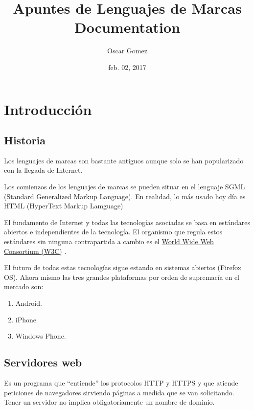 \documentclass[letterpaper,10pt,spanish]{sphinxmanual}
\title{Apuntes de Lenguajes de Marcas Documentation}
\date{feb. 02, 2017}
\author{Oscar Gomez}
\begin{document}
\maketitle
\tableofcontents
{}\label{index::doc}



\chapter{Introducción}
\label{tema1::doc}\label{tema1:apuntes-de-lenguajes-de-marcas}\label{tema1:introduccion}

\section{Historia}
\label{tema1:historia}
Los lenguajes de marcas son bastante antiguos aunque solo se han popularizado con la llegada de Internet.

Los comienzos de los lenguajes de marcas se pueden situar en el lenguaje SGML (Standard Generalized Markup Language). En realidad, lo más usado hoy día es HTML (HyperText Markup Lamguage)

El fundamento de Internet y todas las tecnologías asociadas se basa en estándares abiertos e
independientes de la tecnología. El organismo que regula estos estándares sin ninguna contrapartida a cambio es el \href{http://www.w3c.org}{World Wide Web Consortium (W3C)} .

El futuro de todas estas tecnologías sigue estando en sistemas abiertos (Firefox OS). Ahora mismo las tres grandes plataformas por orden de supremacía en el mercado son:
\begin{enumerate}
\item {} 
Android.

\item {} 
iPhone

\item {} 
Windows Phone.

\end{enumerate}


\section{Servidores web}
\label{tema1:servidores-web}
Es un programa que “entiende” los protocolos HTTP y HTTPS y que atiende peticiones de navegadores
sirviendo páginas a medida que se van solicitando. Tener un servidor no implica obligatoriamente un nombre de dominio.
\end{document}
